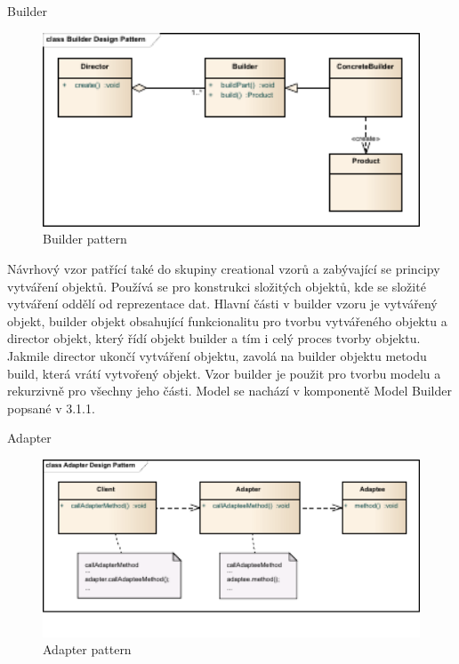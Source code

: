 \documentclass[11pt,twoside,a4paper]{book}
\begin{document}
Builder

\begin{figure}[h]
\begin{center}
\includegraphics[width=13cm]{images-pdf/Builder-Design-Pattern.pdf}
\caption{Builder pattern}
\label{fig:logo}
\end{center}
\end{figure}

Návrhový vzor patřící také do skupiny creational vzorů a zabývající se 
principy vytváření objektů. Používá se pro konstrukci složitých objektů, 
kde se složité vytváření oddělí od reprezentace dat. Hlavní části v builder 
vzoru je vytvářený objekt, builder objekt obsahující funkcionalitu pro 
tvorbu vytvářeného objektu a director objekt, který řídí objekt builder 
a tím i celý proces tvorby objektu. Jakmile director ukončí vytváření objektu, 
zavolá na builder objektu metodu build, která vrátí vytvořený objekt. Vzor 
builder je použit pro tvorbu modelu a rekurzivně pro všechny jeho části. 
Model se nachází v komponentě Model Builder popsané v 3.1.1.

Adapter

\begin{figure}[h]
\begin{center}
\includegraphics[width=13cm]{images-pdf/Adapter-Design-Pattern.pdf}
\caption{Adapter pattern}
\label{fig:logo}
\end{center}
\end{figure}
\end{document}
